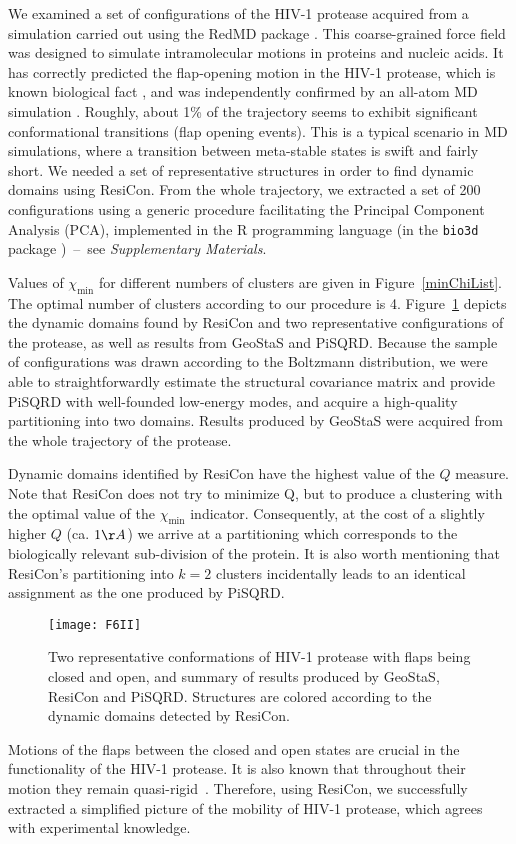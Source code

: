 We examined a set of configurations of the HIV-1 protease acquired from a simulation carried out using the RedMD package \cite{gorecki2009redmd}.
This coarse-grained force field was designed to simulate intramolecular motions in proteins and nucleic acids.
It has correctly predicted the flap-opening motion in the HIV-1 protease, which is known biological fact \cite{hamelberg2005fast}, and was independently confirmed by an all-atom MD simulation \cite{sadiq2010explicit}.
Roughly, about 1\% of the trajectory seems to exhibit significant conformational transitions (flap opening events).
This is a typical scenario in MD simulations, where a transition between meta-stable states is swift and fairly short.
We needed a set of representative structures in order to find dynamic domains using ResiCon.
From the whole trajectory, we extracted a set of 200 configurations using a generic procedure facilitating the Principal Component Analysis (PCA), implemented in the R programming language (in the \texttt{bio3d} package \cite{grant2006bio3d})~--~see \emph{Supplementary Materials}.

Values of $\chi_\text{min}$ for different numbers of clusters are given in Figure~\ref{minChiList}.
The optimal number of clusters according to our procedure is 4.
Figure~\ref{hiv} depicts the dynamic domains found by ResiCon and two representative configurations of the protease, as well as results from GeoStaS and PiSQRD.
Because the sample of configurations was drawn according to the Boltzmann distribution, we were able to straightforwardly estimate the structural covariance matrix and provide PiSQRD with well-founded low-energy modes, and acquire a high-quality partitioning into two domains.
Results produced by GeoStaS were acquired from the whole trajectory of the protease.

Dynamic domains identified by ResiCon have the highest value of the $Q$ measure.
Note that ResiCon does not try to minimize Q, but to produce a clustering with the optimal value of the $\chi_\text{min}$ indicator.
Consequently, at the cost of a slightly higher $Q$ (ca. $1\AA$) we arrive at a partitioning which corresponds to the biologically relevant sub-division of the protein.
It is also worth mentioning that ResiCon’s partitioning into $k=2$ clusters incidentally leads to an identical assignment as the one produced by PiSQRD.

\begin{figure}
\centering
\texttt{[image: F6II]}
\caption{
Two representative conformations of HIV-1 protease with flaps being closed and open, and summary of results produced by GeoStaS, ResiCon and PiSQRD.
Structures are colored according to the dynamic domains detected by ResiCon.
}
\label{hiv}
\end{figure}
Motions of the flaps between the closed and open states are crucial in the functionality of the HIV-1 protease.
It is also known that throughout their motion they remain quasi-rigid~\cite{freedberg2002rapid}.
Therefore, using ResiCon, we successfully extracted a simplified picture of the mobility of HIV-1 protease, which agrees with experimental knowledge.

